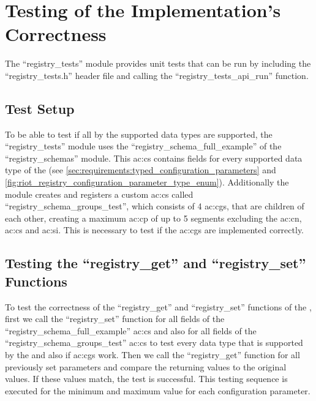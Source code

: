\chapter{Testing of the Implementation's Correctness}
\label{chapter:testing}

The ``registry\_tests'' module provides unit tests that can be run by including the ``registry\_tests.h'' header file and calling the ``registry\_tests\_api\_run'' function.

\section{Test Setup}

To be able to test if all by the  supported data types are supported, the ``registry\_tests'' module uses the ``registry\_schema\_full\_example'' of the ``registry\_schemas'' module.
This \gls{ac:cs} contains fields for every supported data type of the  (see \autoref{sec:requirements:typed_configuration_parameters} and \autoref{fig:riot_registry_configuration_parameter_type_enum}).
Additionally the module creates and registers a custom \gls{ac:cs} called ``registry\_schema\_groups\_test'', which consists of 4 \glspl{ac:cg}, that are children of each other, creating a maximum \gls{ac:cp} of up to 5 segments excluding the \gls{ac:cn}, \gls{ac:cs} and \gls{ac:si}.
This is necessary to test if the \glspl{ac:cg} are implemented correctly.

\section{Testing the ``registry\_get'' and ``registry\_set'' Functions}
\label{sec:testing:get_and_set}

To test the correctness of the ``registry\_get'' and ``registry\_set'' functions of the , first we call the ``registry\_set'' function for all fields of the ``registry\_schema\_full\_example'' \gls{ac:cs} and also for all fields of the ``registry\_schema\_groups\_test'' \gls{ac:cs} to test every data type that is supported by the  and also if \glspl{ac:cg} work.
Then we call the ``registry\_get'' function for all previously set parameters and compare the returning values to the original values.
If these values match, the test is successful.
This testing sequence is executed for the minimum and maximum value for each configuration parameter.

